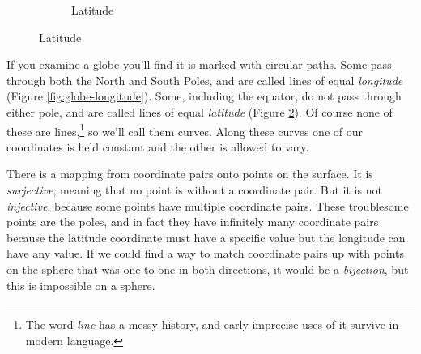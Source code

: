 \begin{figure}[h]
\begin{subfigure}{0.5\textwidth}
    \caption{Latitude} \label{fig:globe-latitude}
    \end{subfigure}
\end{figure}

If you examine a globe you'll find it is marked with circular paths. Some pass through both the North and South Poles, and are called lines of equal \textit{longitude} (Figure \ref{fig:globe-longitude}). Some, including the equator, do not pass through either pole, and are called lines of equal \textit{latitude} (Figure \ref{fig:globe-latitude}). Of course none of these are lines,\footnote{The word \textit{line} has a messy history, and early imprecise uses of it survive in modern language.} so we'll call them curves. Along these curves one of our coordinates is held constant and the other is allowed to vary.

There is a mapping from coordinate pairs onto points on the surface. It is \textit{surjective}, meaning that no point is without a coordinate pair. But it is not \textit{injective}, because some points have multiple coordinate pairs. These troublesome points are the poles, and in fact they have infinitely many coordinate pairs because the latitude coordinate must have a specific value but the longitude can have any value. If we could find a way to match coordinate pairs up with points on the sphere that was one-to-one in both directions, it would be a \textit{bijection}, but this is impossible on a sphere.


